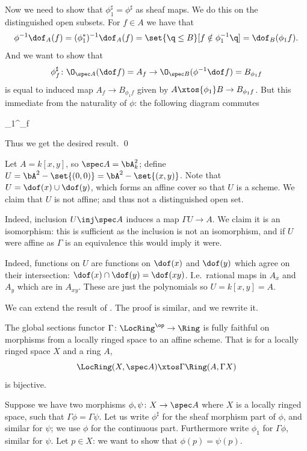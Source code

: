     Now we need to show that $\phi_1^\sharp=\phi^\sharp$ as sheaf maps.
    We do this on the distinguished open subsets.
    For $f\in A$ we have that
    $$ \phi^{-1}\dof_A(f) = (\phi_1^*)^{-1}\dof_A(f) = \set{\q\leq B}[f\notin\phi_1^{-1}\q] = \dof_B(\phi_1f) . $$
    And we want to show that
    $$ \phi^\sharp_f \colon \O_{\spec A}(\dof f) = A_f \to \O_{\spec B}(\phi^{-1}\dof f) = B_{\phi_1f} $$
    is equal to induced map $A_f\to B_{\phi_1f}$ given by $A\xtos{\phi_1}B\to B_{\phi_1f}$.
    But this immediate from the naturality of $\phi$: the following diagram commutes

        {\phi_1}{\phi^\sharp_f}{}{}

    Thus we get the desired result.
    \qed

\eproof

\bexam

    Let $A=k[x,y]$, so $\spec A=\bA^2_k$; define $U=\bA^2-\set{(0,0)}=\bA^2-\set{(x,y)}$.
    Note that $U=\dof(x)\cup\dof(y)$, which forms an affine cover so that $U$ is a scheme.
    We claim that $U$ is not affine; and thus not a distinguished open set.

    Indeed, inclusion $U\inj\spec A$ induces a map $\Gamma U\to A$.
    We claim it is an isomorphism: this is sufficient as the inclusion is not an isomorphism, and if $U$ were affine as $\Gamma$
    is an equivalence this would imply it were.

    Indeed, functions on $U$ are functions on $\dof(x)$ and $\dof(y)$ which agree on their intersection:
    $\dof(x)\cap\dof(y)=\dof(xy)$.
    I.e.\ rational maps in $A_x$ and $A_y$ which are in $A_{xy}$.
    These are just the polynomials so $U=k[x,y]=A$.

\eexam

We can extend the result of .
The proof is similar, and we rewrite it.

\blemm

    The global sections functor $\Gamma\colon\LocRing^\op\to\Ring$ is fully faithful on morphisms from a locally ringed space to an affine scheme.
    That is for a locally ringed space $X$ and a ring $A$,
    $$ \LocRing(X,\spec A) \xtos\Gamma \Ring(A,\Gamma X) $$
    is bijective.

\elemm

\bproof

    Suppose we have two morphisms $\phi,\psi\colon X\to\spec A$ where $X$ is a locally ringed space, such that
    $\Gamma\phi=\Gamma\psi$.
    Let us write $\phi^\sharp$ for the sheaf morphism part of $\phi$, and similar for $\psi$; we use $\phi$ for the continuous
    part.
    Furthermore write $\phi_1$ for $\Gamma\phi$, similar for $\psi$.
    Let $p\in X$: we want to show that $\phi(p)=\psi(p)$.

